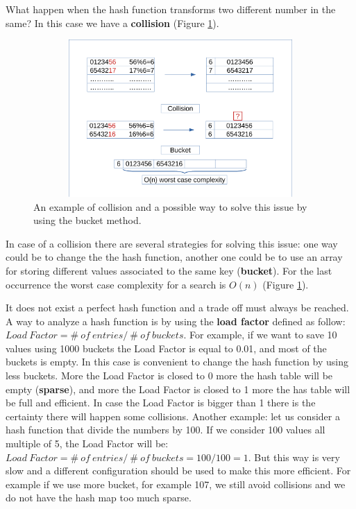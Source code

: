 What happen when the hash function transforms two different number in the same? In this case we have a \textbf{collision} (Figure \ref{map_2}).
\begin{figure}[h]
	\includegraphics[width=14cm,height=6cm]{chapters/datastructures/images/map_2.pdf}
	\caption[]{An example of collision and a possible way to solve this issue by using the bucket method.}
	\label{map_2}
\end{figure}
In case of a collision there are several strategies for solving this issue: one way could be to change the the hash function, another one could be to use an array for storing different values associated to the same key (\textbf{bucket}). For the last occurrence the worst case complexity for a search is \(O(n)\) (Figure \ref{map_2}).

It does not exist a perfect hash function and a trade off must always be reached. A way to analyze a hash function is by using the \textbf{load factor} defined as follow: \(Load \ Factor = \# \ of \ entries / \ \# \ of \ buckets\). For example, if we want to save 10 values using 1000 buckets the Load Factor is equal to 0.01, and most of the buckets is empty. In this case is convenient to change the hash function by using less buckets. More the Load Factor is closed to 0 more the hash table will be empty (\textbf{sparse}), and more the Load Factor is closed to 1 more the has table will be full and efficient. In case the Load Factor is bigger than 1 there is the certainty there will happen some collisions.
Another example: let us consider a hash function that divide the numbers by 100. If we consider 100 values all multiple of 5, the Load Factor will be: \(Load \ Factor = \# \ of \ entries / \ \# \ of \ buckets = 100/100 = 1\). But this way is very slow and a different configuration should be used to make this more efficient. For example if we use more bucket, for example 107, we still avoid collisions and we do not have the hash map too much sparse.

